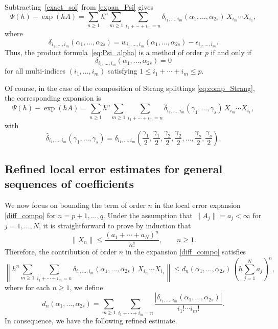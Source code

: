 \documentclass[11pt]{article}
\begin{document}
Subtracting~\eqref{exact_sol} from \eqref{expan_Psi} gives
\begin{equation} \label{diff_compo}
\Psi(h) - \exp(h A) = \sum_{n \ge 1} h^n \sum_{m \ge 1} \sum_{i_1 + \cdots + i_m = n} \delta_{i_1,\ldots,i_m}(\alpha_1,\ldots,\alpha_{2s}) \,  X_{i_m} \cdots X_{i_1},
\end{equation}
where
\begin{equation}
\label{eq:delta}
\delta_{i_1,\ldots,i_m}(\alpha_1,\ldots,\alpha_{2s}) = w_{i_1,\ldots,i_m}(\alpha_1,\ldots,\alpha_{2s}) - \epsilon_{i_1,\ldots,i_m}.
\end{equation}
Thus, the product formula~\eqref{eq:Psi_alpha} is a method of order $p$ if and only if
\begin{equation}
\label{eq:ocond}
\delta_{i_1,\ldots,i_m}(\alpha_1,\ldots,\alpha_{2s}) = 0
\end{equation}
for all multi-indices $(i_1,\ldots,i_m)$ satisfying $1 \le i_1 + \cdots + i_m \le p$.

Of course, in the case of the composition of Strang splittings \eqref{eq:comp_Strang}, the corresponding expansion is
\begin{equation}
\label{eq:error_expansion}
\Psi(h) - \exp(h A) = \sum_{n \ge 1} h^n \sum_{m \ge 1} \sum_{i_1 + \cdots + i_m = n} \hat{\delta}_{i_1,\ldots,i_m}(\gamma_1,\ldots,\gamma_s) \,  X_{i_m} \cdots X_{i_1},
\end{equation}
with
\begin{equation}
\label{eq:hdelta}
\hat{\delta}_{i_1,\ldots,i_m}(\gamma_1,\ldots,\gamma_s) = 
\delta_{i_1,\ldots,i_m} \left(\frac{\gamma_1}{2},\frac{\gamma_1}{2},\frac{\gamma_2}{2},\frac{\gamma_2}{2},\ldots,\frac{\gamma_s}{2}, \frac{\gamma_s}{2} \right).
\end{equation}


\subsection{Refined local error estimates for general sequences of coefficients}

We now focus on bounding the term of order $n$ in the local error expansion \eqref{diff_compo} for $n = p+1, \ldots, q$. Under the assumption that $\|A_j\| = a_j < \infty$ for $j = 1, \ldots, N$, it is straightforward to prove by induction that
\begin{equation}
\label{eq:boundXn}
\|X_n\| \leq \frac{(a_1 + \cdots + a_N)^n}{n!}, \qquad n \geq 1.
\end{equation}
Therefore, the contribution of order $n$ in the expansion \eqref{diff_compo} satisfies
\[
\left\|
h^n \sum_{m \geq 1} \sum_{i_1 + \cdots + i_m = n}  \delta_{i_1,\ldots,i_m}(\alpha_1,\ldots,\alpha_{2s}) \,  X_{i_m} \cdots X_{i_1}
\right\| \leq 
d_n(\alpha_1,\ldots,\alpha_{2s}) \, \left(h \sum_{j=1}^N a_j \right)^n,
\]
where for each $n \geq 1$, we define
\begin{equation}
\label{eq:dn}
d_n(\alpha_1,\ldots,\alpha_{2s}) = \sum_{m \geq 1} \sum_{i_1 + \cdots + i_m = n} \frac{|\delta_{i_1,\ldots,i_m}(\alpha_1,\ldots,\alpha_{2s})|}{i_1! \cdots i_m!}.
\end{equation}
In consequence, we have the following refined estimate.
\end{document}
